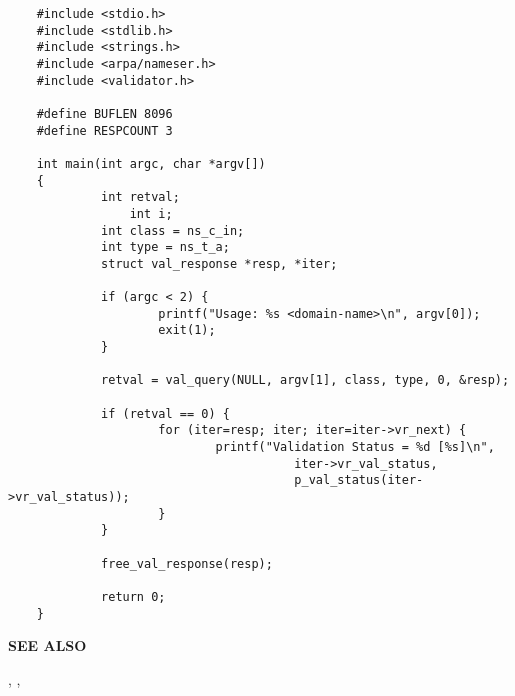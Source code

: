 \begin{verbatim}
    #include <stdio.h>
    #include <stdlib.h>
    #include <strings.h>
    #include <arpa/nameser.h>
    #include <validator.h>

    #define BUFLEN 8096
    #define RESPCOUNT 3

    int main(int argc, char *argv[])
    {
             int retval;
                 int i;
             int class = ns_c_in;
             int type = ns_t_a;
             struct val_response *resp, *iter;

             if (argc < 2) {
                     printf("Usage: %s <domain-name>\n", argv[0]);
                     exit(1);
             }

             retval = val_query(NULL, argv[1], class, type, 0, &resp);

             if (retval == 0) {
                     for (iter=resp; iter; iter=iter->vr_next) {
                             printf("Validation Status = %d [%s]\n",
                                        iter->vr_val_status,
                                        p_val_status(iter->vr_val_status));
                     }
             }

             free_val_response(resp);

             return 0;
    }
\end{verbatim}

{\bf SEE ALSO}


, ,


